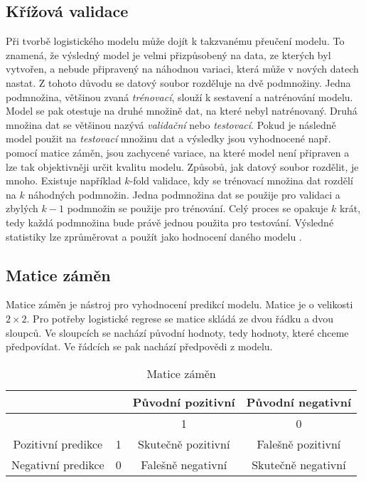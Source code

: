 \subsection{Křížová validace}
Při tvorbě logistického modelu může dojít k takzvanému přeučení modelu. To znamená, že výsledný model je velmi přizpůsobený na data, ze kterých byl vytvořen, a nebude
připravený na náhodnou variaci, která může v nových datech nastat. Z tohoto důvodu se datový soubor rozděluje na dvě podmnožiny. Jedna podmnožina, většinou zvaná
\textit{trénovací},
slouží k sestavení a natrénování modelu. Model se pak otestuje
na druhé množině dat, na které nebyl natrénovaný. Druhá množina dat se většinou nazývá \textit{validační} nebo \textit{testovací}. 
Pokud je následně model použit na \textit{testovací} množinu dat a výsledky jsou vyhodnocené např. pomocí matice záměn, jsou zachycené variace,
na které model není připraven a lze tak objektivněji určit kvalitu modelu. Způsobů, jak datový soubor
rozdělit, je mnoho. Existuje například $k$-fold validace, kdy se trénovací množina dat rozdělí na $k$ 
náhodných podmnožin. Jedna podmnožina dat se použije pro validaci a zbylých $k-1$ podmnožin se použije pro trénování.
Celý proces se opakuje $k$ krát, tedy každá podmnožina bude právě jednou použita pro testování. Výsledné statistiky lze zprůměrovat a použít jako hodnocení
daného modelu \cite{hill_statistics_2006}.

\subsection{Matice záměn}
Matice záměn je nástroj pro vyhodnocení predikcí modelu. Matice je o velikosti $2 \times 2$. Pro potřeby logistické regrese se matice skládá ze dvou řádku a dvou sloupců.
Ve sloupcích se nachází původní hodnoty, tedy hodnoty, které chceme předpovídat. Ve řádcích se pak nachází předpovědi z modelu.  

\begin{table}[H]
    \centering
    \begin{tabular}{|c|c|c|c|}
        \hline
                           &   & Původní pozitivní   & Původní negativní    \\ \hline
                           &   & 1                  & 0                  \\ \hline
        Pozitivní predikce & 1 & Skutečně pozitivní & Falešně pozitivní  \\ \hline
        Negativní predikce & 0 & Falešně negativní  & Skutečně negativní \\ \hline
    \end{tabular}
    \caption{\label{tab:matice_zamen}Matice záměn}
\end{table}

